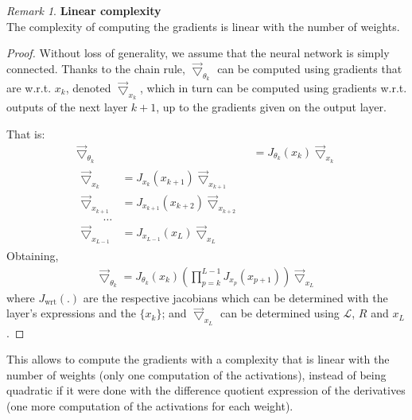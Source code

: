 \documentclass{article}
\theoremstyle{definition}
\theoremstyle{remark}
\newtheorem{remark}{Remark}[section]
\theoremstyle{plain}
\newcommand{\ovec}{}
\begin{document}
\begin{remark}\textbf{Linear complexity}\\
{The complexity of computing the gradients is linear with the number of weights.}
\begin{proof}
Without loss of generality, we assume that the neural network is simply connected. Thanks to the chain rule, $\vec{\bigtriangledown}_{\theta_k}$ can be computed using gradients that are w.r.t. $\ovec{x_k}$, denoted $\vec{\bigtriangledown}_{x_k}$, which in turn can be computed using gradients w.r.t. outputs of the next layer $k+1$, up to the gradients given on the output layer.

That is:
\begin{align}
  \vec{\bigtriangledown}_{\theta_k} & = J_{\theta_k}(\ovec{x_k}) \vec{\bigtriangledown}_{x_k} \\
  \begin{split}
  \vec{\bigtriangledown}_{x_k} & = J_{x_k}(\ovec{x_{k+1}}) \vec{\bigtriangledown}_{x_{k+1}} \\
  \vec{\bigtriangledown}_{x_{k+1}} & = J_{x_{k+1}}(\ovec{x_{k+2}}) \vec{\bigtriangledown}_{x_{k+2}} \\
  \quad \quad \ldots\\
  \vec{\bigtriangledown}_{x_{L-1}} & = J_{x_{L-1}}(\ovec{x_{L}}) \vec{\bigtriangledown}_{x_{L}}
  \label{eq:bp}
  \end{split}
\end{align}
Obtaining,
\begin{align}
  \vec{\bigtriangledown}_{\theta_k} = J_{\theta_k}(\ovec{x_k}) (\prod_{p=k}^{L-1} J_{x_p}(\ovec{x_{p+1}})) \vec{\bigtriangledown}_{x_L}
\end{align}
where $J_{\text{wrt}}(.)$ are the respective jacobians which can be determined with the layer's expressions and the $\{x_k\}$; and $\vec{\bigtriangledown}_{x_L}$ can be determined using $\mathcal{L}$, $R$ and $x_L$.
\end{proof}
This allows to compute the gradients with a complexity that is linear with the number of weights (only one computation of the activations), instead of being quadratic if it were done with the difference quotient expression of the derivatives (one more computation of the activations for each weight).
\end{remark}
\end{document}
